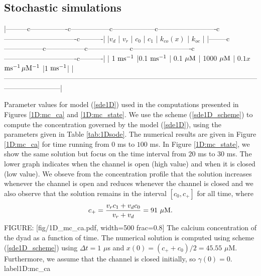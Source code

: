 \subsection{Stochastic simulations}
\label{stochsim}

|---------c----------------c-----------------c------------------c-------------------------c-------------------------------c----------|
|$v_d $            | $v_r $            | $c_0 $           | $c_1 $            | $k_{co}(x) $                        | $k_{oc} $      |
|--------c-----------------c-----------------c------------------c-------------------------c-------------------------------c----------|
| 1 $\rm{ms^{-1}}$ |0.1 $\rm{ms^{-1}}$ | 0.1 $\rm{\mu M}$ | 1000 $\rm{\mu M}$ | $0.1x$ $\rm{ms^{-1}\, \mu M^{-1}} $ |1 $\rm{ms^{-1}}$|
|------------------------------------------------------------------------------------------------------------------------------------|

Parameter values for model (\ref{sde1D}) used in the computations
presented in Figures \ref{1D:mc_ca} and \ref{1D:mc_state}. %
We use the scheme (\ref{sde1D_scheme}) to compute the concentration governed by the model  (\ref{sde1D}),
using the parameters given in Table \ref{tab:1Dsode}.
The numerical results are given in Figure 
\ref{1D:mc_ca} for time running from $0$ ms to $100$ ms. In Figure  \ref{1D:mc_state}, we show the same solution but focus on the time interval from $20$ ms to $30$ ms. The lower graph indicates when the channel is open (high value) and when it is closed (low value). We obseve from the concentration profile that the solution increases whenever the channel is open and reduces whenever the channel is closed and we also observe that the solution remains in the interval $[c_{0} ,c_{+}]$ for all time, where
\[
c_{+}=\frac{v_{r}c_{1}+v_{d}c_{0}}{v_{r}+v_{d}}=91\text{ }\rm{\mu M}.
\]
FIGURE: [fig/1D_mc_ca.pdf, width=500 frac=0.8] The calcium concentration of the dyad as a function of time. The numerical solution is computed using scheme  (\ref{sde1D_scheme}) using $\Delta t =1$ $\mu$s and
$x(0) = (c_{+} +c_0)/2 = 45.55$ $\mu$M. Furthermore, we assume that the channel is closed initially, so $\gamma(0)=0$.  label{1D:mc_ca}%


